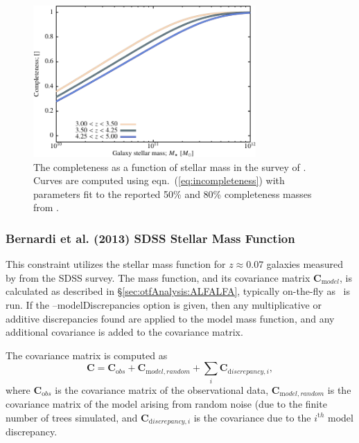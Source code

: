 \begin{figure}
 \begin{center}
 \includegraphics[width=85mm,trim=0mm 0mm 0mm 4mm,clip]{Plots/DataAnalysis/UKIDSSUDSCompleteness.pdf}
 \caption{The completeness as a function of stellar mass in the survey of \protect\cite{caputi_stellar_2011}. Curves are computed using eqn.~(\protect\ref{eq:incompleteness}) with parameters fit to the reported 50\% and 80\% completeness masses from \protect\cite{caputi_stellar_2011}.}
 \end{center}
 \label{fig:UKIDSSUDSCompleteness}
\end{figure}

\subsubsection{Bernardi et al. (2013) SDSS Stellar Mass Function}\label{sec:AnalysisBernardiSDSSStellarMassFunction}

This constraint utilizes the stellar mass function for $z\approx 0.07$ galaxies measured by \cite{bernardi_massive_2013} from the SDSS survey. The mass function, and its covariance matrix ${\mathbf C}_{\mathrm model}$, is calculated as described in \S\ref{sec:otfAnalysis:ALFALFA}, typically on-the-fly as \glc\ is run. If the {\normalfont \ttfamily --modelDiscrepancies} option is given, then any multiplicative or additive discrepancies found are applied to the model mass function, and any additional covariance is added to the covariance matrix.

The covariance matrix is computed as
\begin{equation}
 {\mathbf C} = {\mathbf C}_{\mathrm obs} + {\mathbf C}_{\mathrm model,random} + \sum_i {\mathbf C}_{{\mathrm discrepancy}, i},
\end{equation}
where ${\mathbf C}_{\mathrm obs}$ is the covariance matrix of the observational data, ${\mathbf C}_{\mathrm model,random}$ is the covariance matrix of the model arising from random noise (due to the finite number of trees simulated, and ${\mathbf C}_{{\mathrm discrepancy}, i}$ is the covariance due to the $i^{\mathrm th}$ model discrepancy.

